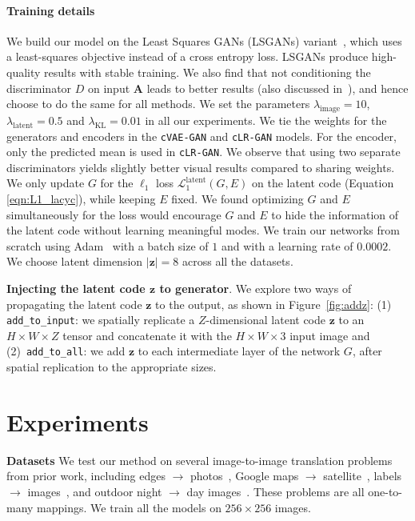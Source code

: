 \paragraph{Training details} We build our model on the Least Squares GANs (LSGANs) variant~\citep{mao2016least}, which uses a least-squares objective instead of a cross entropy loss. LSGANs produce high-quality results with stable training. We also find that not conditioning the discriminator $D$ on input $\mathbf{A}$ leads to better results (also discussed in~\citep{pathakCVPR16context}), and hence choose to do the same for all methods. We set the parameters $\lambda_{\text{image}}=10$, $\lambda_{\text{latent}}=0.5$ and $\lambda_{\text{KL}}=0.01$ in all our experiments. We tie the weights for the generators and encoders in the \texttt{cVAE-GAN} and \texttt{cLR-GAN} models. For the encoder, only the predicted mean is used in \texttt{cLR-GAN}. We observe that using two separate discriminators yields slightly better visual results compared to sharing weights. We only update $G$ for the $\ell_1$ loss $\mathcal{L}_{1}^{\text{latent}}(G,E)$ on the latent code (Equation \ref{eqn:L1_lacyc}), while keeping $E$ fixed. We found optimizing $G$ and $E$ simultaneously for the loss would encourage $G$ and $E$ to hide the information of the latent code without learning meaningful modes. We train our networks from scratch using Adam~\citep{kingma2014adam} with a batch size of $1$ and with a learning rate of $0.0002$. We choose latent dimension $|\mathbf{z}|=8$ across all the datasets. 

{\bf Injecting the latent code $\mathbf{z}$ to generator}. We explore two ways of propagating the latent code $\mathbf{z}$ to the output, as shown in Figure~\ref{fig:addz}: 
(1) \texttt{add\_to\_input}: we spatially replicate a $Z$-dimensional latent code $\mathbf{z}$ to an $H\!\times W\!\times Z$ tensor and concatenate it with the $H\!\times W\!\times 3$ input image and (2)~\texttt{add\_to\_all}: we add $\mathbf{z}$ to each intermediate layer of the network $G$, after spatial replication to the appropriate sizes.

\section{Experiments}
\label{sec:exp}

{\bf Datasets} We test our method on several image-to-image translation problems from prior work, including edges $\rightarrow$ photos~\citep{yu2014fine,zhu2016generative}, Google maps $\rightarrow$ satellite~\citep{isola2016image}, labels $\rightarrow$ images~\citep{Cordts2016Cityscapes}, and outdoor night $\rightarrow$ day images~\citep{Laffont14}. These problems are all one-to-many mappings. We train all the models on $256\times 256$ images.

